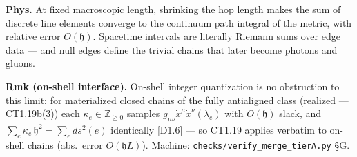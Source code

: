 \begin{corollary}[{\texorpdfstring{CT1.19a}{CT1.19a}}]
\textbf{Phys.} At fixed macroscopic length, shrinking the hop length makes the sum of discrete line elements converge to the continuum path integral of the metric, with relative error $O(\mathfrak h)$. Spacetime intervals are literally Riemann sums over edge data — and null edges define the trivial chains that later become photons and gluons.

\textbf{Rmk (on-shell interface).} On-shell integer quantization is no obstruction to this limit: for materialized closed chains of the fully antialigned class (realized — CT1.19b(3)) each $\kappa_e\in\mathbb Z_{\ge0}$ samples $g_{\mu\nu}\dot x^\mu\dot x^\nu(\lambda_e)$ with $O(\mathfrak h)$ slack, and $\sum_e\kappa_e\,\mathfrak h^2=\sum_e ds^2(e)$ identically [D1.6] — so CT1.19 applies verbatim to on-shell chains (abs.\ error $O(\mathfrak hL)$). Machine: \texttt{checks/\allowbreak{}verify\_\allowbreak{}merge\_\allowbreak{}tierA.py} §G.

\end{corollary}

